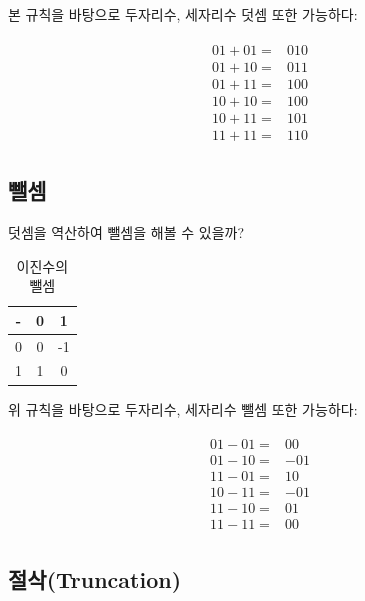 \documentclass[a4paper,12pt]{book}
\begin{document}
\begin{appendices}
본 규칙을 바탕으로 두자리수, 세자리수 덧셈 또한 가능하다:

\begin{align}
\begin{split}
    01 + 01 =& 010 \\
    01 + 10 =& 011 \\
    01 + 11 =& 100 \\
    10 + 10 =& 100 \\
    10 + 11 =& 101 \\
    11 + 11 =& 110
\end{split}
\end{align}

\subsection{뺄셈}
\label{sec:substitution-binary}

덧셈을 역산하여 뺄셈을 해볼 수 있을까?

\begin{table}[H]
    \centering

    \caption{이진수의 뺄셈}
    \label{Tab:substitution-binary}

    \begin{tabular}{ || c || c | c || }
        \hline
        - & 0  & 1  \\
        \hline\hline
        0 & 0  & -1 \\
        \hline
        1 & 1  & 0  \\
        \hline
    \end{tabular}
\end{table}

위 규칙을 바탕으로 두자리수, 세자리수 뺄셈 또한 가능하다:

\begin{align}
\begin{split}
    01 - 01 =& 00 \\
    01 - 10 =& -01 \\
    11 - 01 =& 10 \\
    10 - 11 =& -01 \\
    11 - 10 =& 01 \\
    11 - 11 =& 00
\end{split}
\end{align}

\subsection{절삭(Truncation)}


\end{appendices}
\end{document}
